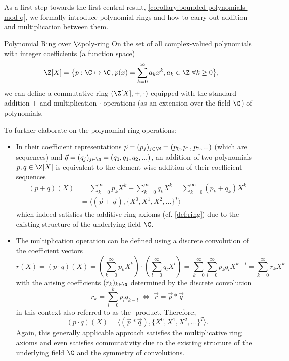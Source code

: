 As a first step towards the first central result, \cref{corollary:bounded-polynomials-mod-q}, we formally introduce polynomial rings and how to carry out addition and multiplication between them.

\begin{definition}{Polynomial Ring over $\Z$}{poly-ring}
  On the set of all complex-valued polynomials with integer coefficients (a function space)
  $$\Z[X] = \big\{p: \C \mapsto \C \,, p(x) = \sum_{k=0}^\infty a_k x^k, a_k \in \Z \;\forall k \geq 0\big\},$$
  we can define a commutative ring $(\Z[X], +, \cdot)$ equipped with the standard addition $+$ and multiplication $\cdot$ operations (as an extension over the field $\C$) of polynomials.
\end{definition}

To further elaborate on the polynomial ring operations:
\begin{itemize}
  \item In their coefficient representations $\vec{p} = (p_j)_{j\in\N} = (p_0, p_1, p_2, ...)$ (which are sequences) and $\vec{q} = (q_j)_{j\in\N} = (q_0, q_1, q_2, ...)$, an addition of two polynomials $p, q \in \Z[X]$ is equivalent to the element-wise addition of their coefficient sequences
        \begin{align*}
          (p + q)(X) & = \sum_{k=0}^\infty p_k X^k + \sum_{k=0}^\infty q_k X^k = \sum_{k=0}^\infty (p_k + q_k) X^k \\
                     & = \langle (\vec{p} + \vec{q}), \{X^0, X^1, X^2, ...\}^T \rangle
        \end{align*}
        which indeed satisfies the additive ring axioms (cf. \cref{def:ring}) due to the existing structure of the underlying field $\C$.
  \item The multiplication operation can be defined using a discrete convolution of the coefficient vectors
        $$r(X) = (p \cdot q)(X) = (\sum_{k=0}^\infty p_k X^k) \cdot (\sum_{l=0}^\infty q_l X^l)
          = \sum_{k=0}^\infty \sum_{l=0}^\infty p_k q_l X^{k+l}
          = \sum_{k=0}^\infty r_k X^k$$
        with the arising coefficients $(r_k)_{k\in\N}$ determined by the discrete convolution
        $$r_k = \sum_{l=0}^k p_l q_{k-l} \;\Leftrightarrow\; \vec{r} = \vec{p} * \vec{q}$$
        in this context also referred to as the -product. Therefore,
        $$(p \cdot q)(X) = \langle (\vec{p} * \vec{q}), \{X^0, X^1, X^2, ...\}^T \rangle.$$
        Again, this generally applicable approach satisfies the multiplicative ring axioms and even satisfies commutativity due to the existing structure of the underlying field $\C$ and the symmetry of convolutions.
\end{itemize}

